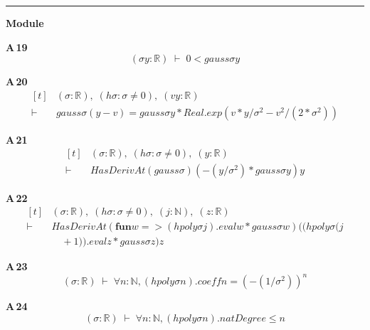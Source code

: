 \vspace{4pt}\noindent\rule{\columnwidth}{0.4pt}\par\vspace{2pt}
\noindent\textbf{Module }\par\vspace{3pt}

\noindent\textbf{A\,19}\quad{}
{\footnotesize\[ (\sigma \mathit{y} : \mathbb{R} ) \;\vdash\; 0 < \mathit{gauss} \sigma \mathit{y} \]}

\noindent\textbf{A\,20}\quad{}
{\footnotesize\[ \begin{aligned}[t]
&(\sigma : \mathbb{R} ),\; (\mathit{hσ} : \sigma \neq 0),\; (\mathit{v} \mathit{y} : \mathbb{R} )\\
\vdash\;&\mathit{gauss} \sigma (\mathit{y} - \mathit{v}) = \mathit{gauss} \sigma \mathit{y} * \mathit{Real}.\mathit{exp} (\mathit{v} * \mathit{y} / \sigma ^{2} - \mathit{v} ^{2} / (2 * \sigma ^{2}))
\end{aligned} \]}

\noindent\textbf{A\,21}\quad{}
{\footnotesize\[ \begin{aligned}[t]
&(\sigma : \mathbb{R} ),\; (\mathit{hσ} : \sigma \neq 0),\; (\mathit{y} : \mathbb{R} )\\
\vdash\;&\mathit{HasDerivAt} (\mathit{gauss} \sigma ) (-(\mathit{y} / \sigma ^{2}) * \mathit{gauss} \sigma \mathit{y}) \mathit{y}
\end{aligned} \]}

\noindent\textbf{A\,22}\quad{}
{\footnotesize\[ \begin{aligned}[t]
&(\sigma : \mathbb{R} ),\; (\mathit{hσ} : \sigma \neq 0),\; (\mathit{j} : \mathbb{N} ),\; (\mathit{z} : \mathbb{R} )\\
\vdash\;&\mathit{HasDerivAt} (\mathbf{fun} \mathit{w} => (\mathit{hpoly} \sigma \mathit{j}).\mathit{eval} \mathit{w} * \mathit{gauss} \sigma \mathit{w}) ((\mathit{hpoly} \sigma (\mathit{j}\\
&\quad + 1)).\mathit{eval} \mathit{z} * \mathit{gauss} \sigma \mathit{z}) \mathit{z}
\end{aligned} \]}

\noindent\textbf{A\,23}\quad{}
{\footnotesize\[ (\sigma : \mathbb{R} ) \;\vdash\; \forall \mathit{n} : \mathbb{N} , (\mathit{hpoly} \sigma \mathit{n}).\mathit{coeff} \mathit{n} = (-(1 / \sigma ^{2})) ^{\mathit{n}} \]}

\noindent\textbf{A\,24}\quad{}
{\footnotesize\[ (\sigma : \mathbb{R} ) \;\vdash\; \forall \mathit{n} : \mathbb{N} , (\mathit{hpoly} \sigma \mathit{n}).\mathit{natDegree} \leq \mathit{n} \]}

